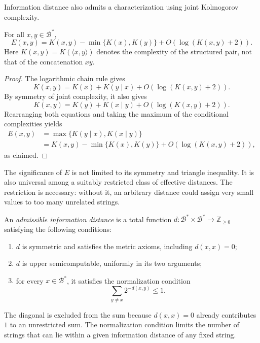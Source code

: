 Information distance also admits a characterization using joint Kolmogorov complexity.

\begin{proposition}
\label{prop:information-distance-joint}
For all $x,y\in\mathcal{B}^*$,
\[
E(x,y)=K(x,y)-\min\{K(x),K(y)\}+O(\log(K(x,y)+2)).
\]
Here $K(x,y)=K(\langle x,y\rangle)$ denotes the complexity of the structured pair, not that of the concatenation $xy$.
\end{proposition}
\begin{proof}
The logarithmic chain rule gives
\[
K(x,y)=K(x)+K(y\mid x)+O(\log(K(x,y)+2)).
\]
By symmetry of joint complexity, it also gives
\[
K(x,y)=K(y)+K(x\mid y)+O(\log(K(x,y)+2)).
\]
Rearranging both equations and taking the maximum of the conditional complexities yields
\[
\begin{aligned}
E(x,y)
&=\max\{K(y\mid x),K(x\mid y)\}\\
&=K(x,y)-\min\{K(x),K(y)\}+O(\log(K(x,y)+2)),
\end{aligned}
\]
as claimed.
\end{proof}

The significance of $E$ is not limited to its symmetry and triangle inequality. It is also universal among a suitably restricted class of effective distances. The restriction is necessary: without it, an arbitrary distance could assign very small values to too many unrelated strings.

\begin{definition}
\label{def:admissible-information-distance}
An \emph{admissible information distance} is a total function
$d:\mathcal{B}^*\times\mathcal{B}^*\rightarrow\mathbb{Z}_{\geq 0}$ satisfying the following conditions:
\begin{enumerate}
\item $d$ is symmetric and satisfies the metric axioms, including $d(x,x)=0$;
\item $d$ is upper semicomputable, uniformly in its two arguments;
\item for every $x\in\mathcal{B}^*$, it satisfies the normalization condition
\[
\sum_{y\neq x}2^{-d(x,y)}\leq 1.
\]
\end{enumerate}
\end{definition}

The diagonal is excluded from the sum because $d(x,x)=0$ already contributes $1$ to an unrestricted sum. The normalization condition limits the number of strings that can lie within a given information distance of any fixed string.

